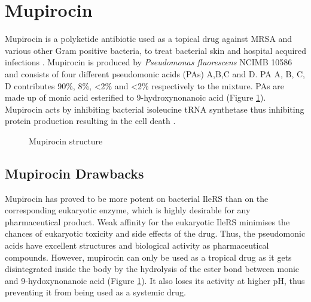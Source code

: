 	\section{Mupirocin}
	\label{sec:Mup}
	Mupirocin is a polyketide antibiotic used as a topical drug against MRSA and various other  Gram positive bacteria, to treat bacterial skin and hospital acquired infections \parencite{Fuller1971}. Mupirocin is produced by \textit{Pseudomonas fluorescens} NCIMB 10586 and consists of four different pseudomonic acids (PAs) A,B,C and D. PA A, B, C, D contributes 90\%, 8\%, \textless2\% and \textless2\% respectively to the mixture. PAs are made up of monic acid esterified to 9-hydroxynonanoic acid (Figure \ref{fig:mupirocin}). Mupirocin acts by inhibiting bacterial isoleucine tRNA synthetase  thus inhibiting protein production resulting in the cell death \parencite{Hughes1978}.
	
	\setlength\fboxsep{5pt}
	\setlength\fboxrule{1.5pt}
	\begin{figure} []
	\centering
	\caption[Mupirocin structure]{Mupirocin structure}
	\label{fig:mupirocin}
	\end{figure}
	
		\subsection{Mupirocin Drawbacks}
		\label{sec:MupDrawbacks}
		Mupirocin has proved to be more potent on bacterial IleRS than on the corresponding eukaryotic enzyme, which is highly desirable for any pharmaceutical product. Weak affinity for the eukaryotic IleRS minimises the chances of eukaryotic toxicity and side effects of the drug. Thus, the pseudomonic acids have excellent structures and biological activity as pharmaceutical compounds. However, mupirocin can only be used as a tropical drug as it gets disintegrated inside the body by the hydrolysis of the ester bond between monic and 9-hydoxynonanoic acid (Figure \ref{fig:mupirocin}). It also loses its activity at higher pH, thus preventing it from being used as a systemic drug.
		
